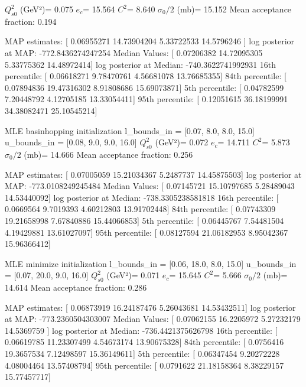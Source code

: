 \documentclass{article}
\begin{document}
$Q_{s0}^{2}$ (GeV²)= 0.075
$e_c$= 15.564
$C^{2}$= 8.640
$\sigma_0/2$ (mb)= 15.152
Mean acceptance fraction: 0.194

MAP estimates:  [ 0.06955271 14.73904204  5.33722533 14.5796246 ]
log posterior at MAP:  -772.8436274247254
Median Values:  [ 0.07206382 14.72095305  5.33775362 14.48972414]
log posterior at Median:  -740.3622741992931
16th percentile:  [ 0.06618271  9.78470761  4.56681078 13.76685355]
84th percentile:  [ 0.07894836 19.47316302  8.91808686 15.69073871]
5th percentile:  [ 0.04782599  7.20448792  4.12705185 13.33054411]
95th percentile:  [ 0.12051615 36.18199991 34.38082471 25.10545214]

MLE basinhopping initialization
l_bounds_in = [0.07, 8.0, 8.0, 15.0]
u_bounds_in = [0.08, 9.0, 9.0, 16.0]
$Q_{s0}^{2}$ (GeV²)= 0.072
$e_c$= 14.711
$C^{2}$= 5.873
$\sigma_0/2$ (mb)= 14.666
Mean acceptance fraction: 0.256

MAP estimates:  [ 0.07005059 15.21034367  5.2487737  14.45875503]
log posterior at MAP:  -773.0108249245484
Median Values:  [ 0.07145721 15.10797685  5.28489043 14.53440092]
log posterior at Median:  -738.3305238581818
16th percentile:  [ 0.0669564   9.7019393   4.60212803 13.91702448]
84th percentile:  [ 0.07743309 19.21658998  7.67840886 15.44066853]
5th percentile:  [ 0.06445767  7.54481504  4.19429881 13.61027097]
95th percentile:  [ 0.08127594 21.06182953  8.95042367 15.96366412]

MLE minimize initialization
l_bounds_in = [0.06, 18.0, 8.0, 15.0]
u_bounds_in = [0.07, 20.0, 9.0, 16.0]
$Q_{s0}^{2}$ (GeV²)= 0.071
$e_c$= 15.645
$C^{2}$= 5.666
$\sigma_0/2$ (mb)= 14.614
Mean acceptance fraction: 0.286


MAP estimates:  [ 0.06873919 16.24187476  5.26043681 14.53432511]
log posterior at MAP:  -773.2360504303007
Median Values:  [ 0.07062155 16.2205972   5.27232179 14.5369759 ]
log posterior at Median:  -736.4421375626798
16th percentile:  [ 0.06619785 11.23307499  4.54673174 13.90675328]
84th percentile:  [ 0.0756416  19.3657534   7.12498597 15.36149611]
5th percentile:  [ 0.06347454  9.20272228  4.08004464 13.57408794]
95th percentile:  [ 0.0791622  21.18158364  8.38229157 15.77457717]
\end{document}
